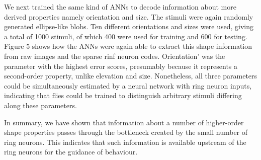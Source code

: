 We next trained the same kind of ANNs to decode information about more derived properties namely orientation and size.
The stimuli were again randomly generated ellipse-like blobs.
Ten different orientations and sizes were used, giving a total of 1000 stimuli, of which 400 were used for training and 600 for testing.
Figure 5 shows how the ANNs were again able to extract this shape information from raw images and the sparse rinf neuron codes. Orientation' was the parameter with the highest error scores, presumably because it represents a second-order property, unlike elevation and size.
Nonetheless, all three parameters could be simultaneously estimated by a neural network with ring neuron inputs, indicating that flies could be trained to distinguish arbitrary stimuli differing along these parameters.

In summary, we have shown that information about a number of higher-order shape properties passes through the bottleneck created by the small number of ring neurons.
This indicates that such information is available upstream of the ring neurons for the guidance of behaviour. 
